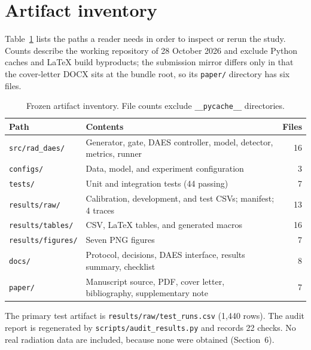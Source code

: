 \documentclass[11pt]{article}
\begin{document}
\clearpage
\section{Artifact inventory}

Table~\ref{tab:artifacts} lists the paths a reader needs in order to inspect or rerun the study. Counts describe the working repository of 28 October 2026 and exclude Python caches and \LaTeX{} build byproducts; the submission mirror differs only in that the cover-letter DOCX sits at the bundle root, so its \texttt{paper/} directory has six files.

\begin{table}[htbp]
\centering
\caption{Frozen artifact inventory. File counts exclude \texttt{\_\_pycache\_\_} directories.}
\label{tab:artifacts}
\small
\setlength{\tabcolsep}{4pt}
\begin{tabular}{llr}
\toprule
Path & Contents & Files \\
\midrule
\texttt{src/rad\_daes/} & Generator, gate, DAES controller, model, detector, metrics, runner & 16 \\
\texttt{configs/} & Data, model, and experiment configuration & 3 \\
\texttt{tests/} & Unit and integration tests (44 passing) & 7 \\
\texttt{results/raw/} & Calibration, development, and test CSVs; manifest; 4 traces & 13 \\
\texttt{results/tables/} & CSV, \LaTeX{} tables, and generated macros & 16 \\
\texttt{results/figures/} & Seven PNG figures & 7 \\
\texttt{docs/} & Protocol, decisions, DAES interface, results summary, checklist & 8 \\
\texttt{paper/} & Manuscript source, PDF, cover letter, bibliography, supplementary note & 7 \\
\bottomrule
\end{tabular}
\end{table}

The primary test artifact is \texttt{results/raw/test\_runs.csv} (1{,}440 rows). The audit report is regenerated by \texttt{scripts/audit\_results.py} and records 22 checks. No real radiation data are included, because none were obtained (Section~6).
\end{document}

